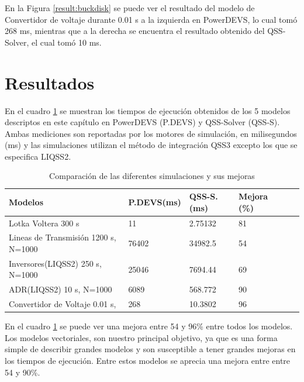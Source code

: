 En la Figura \ref{result:buckdisk} se puede ver el resultado del modelo de Convertidor de voltaje durante 0.01 s a la izquierda en PowerDEVS, lo cual tomó 268 ms, 
mientras que a la derecha se encuentra el resultado obtenido del QSS-Solver, el cual tomó 10 ms.

\section{Resultados}

	En el cuadro \ref{tab:result} se muestran los tiempos de ejecución obtenidos de los 5 modelos descriptos en este capítulo en  
	PowerDEVS (P.DEVS) y QSS-Solver (QSS-S). Ambas mediciones son reportadas por los motores de simulación, en milisegundos (ms) y
	las simulaciones utilizan el método de integración QSS3 excepto los que se especifica LIQSS2.

\begin{table}[H]
\centering	
\begin{tabular}{llllll}
\toprule
{\bf Modelos}            &  {\bf P.DEVS(ms)} & {\bf QSS-S. (ms)} & {\bf Mejora (\%)} \\
\toprule
Lotka  Voltera 300 s      		& 11            & 2.75132         & 81 \\
Lineas de Transmisión 1200 s, N=1000     & 76402         & 34982.5         & 54          \\
Inversores(LIQSS2) 250 s, N=1000   	& 25046         & 7694.44         & 69        \\
ADR(LIQSS2) 10 s, N=1000 		& 6089          & 568.772         & 90        \\
Convertidor de Voltaje 0.01 s,        	& 268           & 10.3802         & 96         

\end{tabular}
\caption{Comparación de las diferentes simulaciones y sus mejoras}\label{tab:result}
\end{table}

	En el cuadro \ref{tab:result} se puede ver una mejora entre 54 y 96\% entre todos los modelos.
	Los modelos vectoriales, son nuestro principal objetivo, ya que es una forma simple de describir grandes modelos y son susceptible a tener grandes mejoras
	en los tiempos de ejecución. Entre estos modelos se aprecia una mejora entre entre 54 y 90\%.
